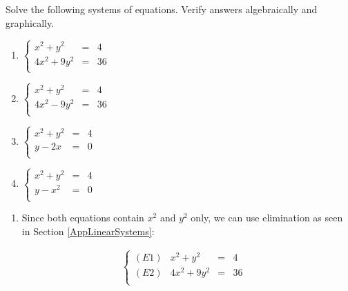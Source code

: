 \documentclass{ximera}
\begin{document}
\begin{example}  \label{nonlinearex1} Solve the following systems of equations.  Verify  answers algebraically and  graphically.


\begin{enumerate}

\item  $\left\{\begin{array}{rcr}  x^2 +y^2 & = & 4 \\ 4x^2+9y^2 & = & 36 \\ \end{array} \right.$

\item  $\left\{\begin{array}{rcr}  x^2 +y^2 & = & 4 \\ 4x^2-9y^2 & = & 36 \\ \end{array} \right.$


\item  $\left\{\begin{array}{rcr}  x^2 +y^2 & = & 4 \\ y - 2x & = & 0 \\ \end{array} \right.$

\item  $\left\{\begin{array}{rcr}  x^2 +y^2 & = & 4 \\ y  - x^2 & = & 0 \\ \end{array} \right.$

\end{enumerate}

\begin{explanation}

\begin{enumerate}

\item  Since both equations contain $x^2$ and $y^2$ only, we can use elimination as seen in Section \ref{AppLinearSystems}:

\[ \begin{array}{ccc}

\left\{\begin{array}{lrcr} (E1) & x^2 +y^2 & = & 4 \\ (E2) & 4x^2+9y^2 & = & 36 \\ \end{array} \right.

&


\end{array}\]
\end{enumerate}
\end{explanation}
\end{example}
\end{document}
